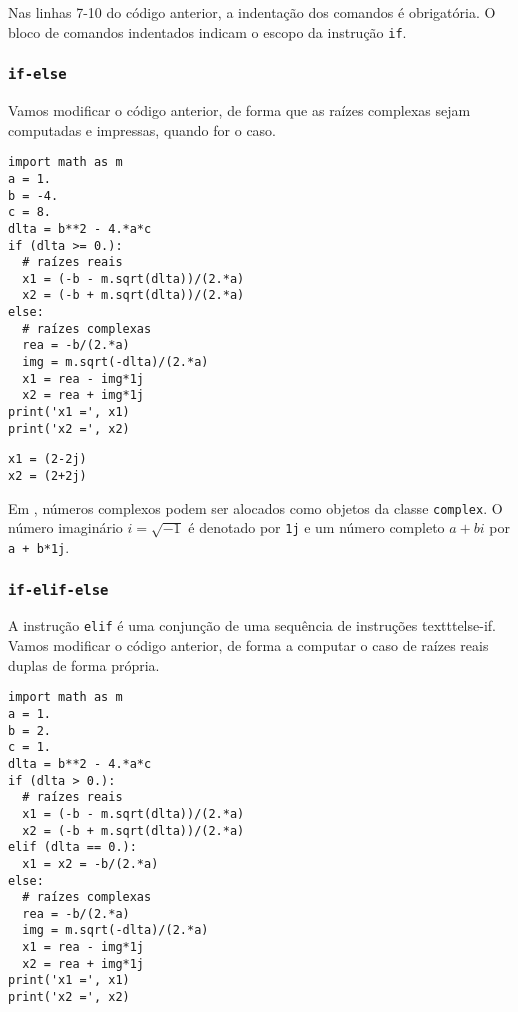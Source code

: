 \begin{obs}
  Nas linhas 7-10 do código anterior, a indentação dos comandos é obrigatória. O bloco de comandos indentados indicam o escopo da instrução \texttt{if}.
\end{obs}

\subsubsection{\texttt{if-else}}

Vamos modificar o código anterior, de forma que as raízes complexas sejam computadas e impressas, quando for o caso.

\begin{lstlisting}
import math as m
a = 1.
b = -4.
c = 8.
dlta = b**2 - 4.*a*c
if (dlta >= 0.):
  # raízes reais
  x1 = (-b - m.sqrt(dlta))/(2.*a)
  x2 = (-b + m.sqrt(dlta))/(2.*a)
else:
  # raízes complexas
  rea = -b/(2.*a)
  img = m.sqrt(-dlta)/(2.*a)
  x1 = rea - img*1j
  x2 = rea + img*1j
print('x1 =', x1)
print('x2 =', x2)
\end{lstlisting}

\begin{verbatim}
x1 = (2-2j)
x2 = (2+2j)
\end{verbatim}

\begin{obs}
  Em {\python}, números complexos podem ser alocados como objetos da classe \texttt{complex}. O número imaginário $i = \sqrt{-1}$ é denotado por \texttt{1j} e um número completo $a + bi$ por \texttt{a + b*1j}.
\end{obs}

\subsubsection{\texttt{if-elif-else}}

A instrução \texttt{elif} é uma conjunção de uma sequência de instruções texttt{else-if}. Vamos modificar o código anterior, de forma a computar o caso de raízes reais duplas de forma própria.

\begin{lstlisting}
import math as m
a = 1.
b = 2.
c = 1.
dlta = b**2 - 4.*a*c
if (dlta > 0.):
  # raízes reais
  x1 = (-b - m.sqrt(dlta))/(2.*a)
  x2 = (-b + m.sqrt(dlta))/(2.*a)
elif (dlta == 0.):
  x1 = x2 = -b/(2.*a)
else:
  # raízes complexas
  rea = -b/(2.*a)
  img = m.sqrt(-dlta)/(2.*a)
  x1 = rea - img*1j
  x2 = rea + img*1j
print('x1 =', x1)
print('x2 =', x2)
\end{lstlisting}

